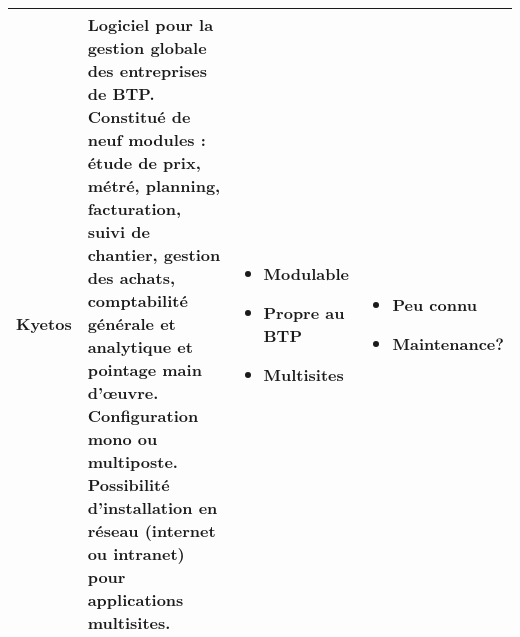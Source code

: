 \begin{center}
\begin{tabular}{|p{1cm}|p{7cm}|p{3.3cm}|p{3.3cm}|}
Kyetos &
Logiciel pour la gestion globale des entreprises de BTP. Constitué de neuf modules : étude de prix, métré, planning, facturation, suivi de chantier, gestion des achats, comptabilité générale et analytique et pointage main d'\oe uvre.
Configuration mono ou multiposte. Possibilité d'installation en réseau (internet ou intranet) pour applications multisites. &
\begin{itemize}
  \item Modulable
  \item Propre au BTP
  \item Multisites
 \end{itemize} &
  \begin{itemize}
  \item Peu connu
  \item Maintenance?
 \end{itemize}\\ \hline

 
\end{tabular}
\end{center}

